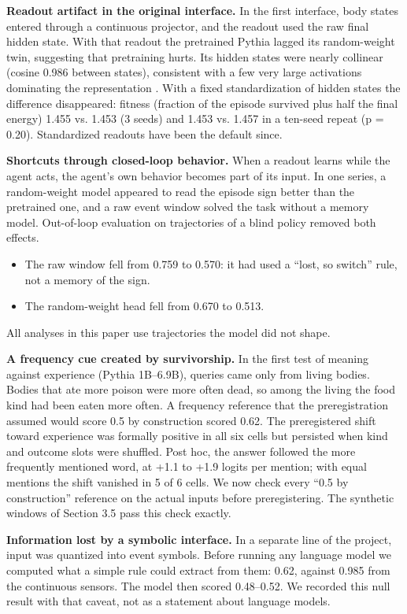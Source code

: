 \documentclass[11pt]{article}
\begin{document}
\textbf{Readout artifact in the original interface.} In the first interface, body states entered through a continuous projector, and the readout used the raw final hidden state. With that readout the pretrained Pythia lagged its random-weight twin, suggesting that pretraining hurts. Its hidden states were nearly collinear (cosine 0.986 between states), consistent with a few very large activations dominating the representation \citep{sun2024}. With a fixed standardization of hidden states the difference disappeared: fitness (fraction of the episode survived plus half the final energy) 1.455 vs. 1.453 (3 seeds) and 1.453 vs. 1.457 in a ten-seed repeat (p = 0.20). Standardized readouts have been the default since.

\textbf{Shortcuts through closed-loop behavior.} When a readout learns while the agent acts, the agent's own behavior becomes part of its input. In one series, a random-weight model appeared to read the episode sign better than the pretrained one, and a raw event window solved the task without a memory model. Out-of-loop evaluation on trajectories of a blind policy removed both effects.
\begin{itemize}
\item The raw window fell from 0.759 to 0.570: it had used a ``lost, so switch'' rule, not a memory of the sign.
\item The random-weight head fell from 0.670 to 0.513.
\end{itemize}

All analyses in this paper use trajectories the model did not shape.

\textbf{A frequency cue created by survivorship.} In the first test of meaning against experience (Pythia 1B--6.9B), queries came only from living bodies. Bodies that ate more poison were more often dead, so among the living the food kind had been eaten more often. A frequency reference that the preregistration assumed would score 0.5 by construction scored 0.62. The preregistered shift toward experience was formally positive in all six cells but persisted when kind and outcome slots were shuffled. Post hoc, the answer followed the more frequently mentioned word, at +1.1 to +1.9 logits per mention; with equal mentions the shift vanished in 5 of 6 cells. We now check every ``0.5 by construction'' reference on the actual inputs before preregistering. The synthetic windows of Section 3.5 pass this check exactly.

\textbf{Information lost by a symbolic interface.} In a separate line of the project, input was quantized into event symbols. Before running any language model we computed what a simple rule could extract from them: 0.62, against 0.985 from the continuous sensors. The model then scored 0.48--0.52. We recorded this null result with that caveat, not as a statement about language models.
\end{document}
